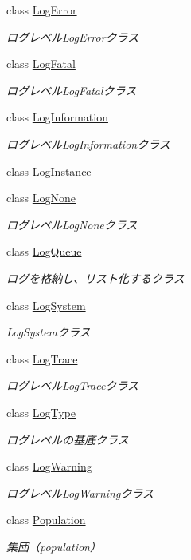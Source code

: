 \begin{DoxyCompactItemize}
class \mbox{\hyperlink{class_g_a_1_1_log_error}{Log\+Error}}
\begin{DoxyCompactList}\small\item\em ログレベル\+Log\+Errorクラス \end{DoxyCompactList}\item 
class \mbox{\hyperlink{class_g_a_1_1_log_fatal}{Log\+Fatal}}
\begin{DoxyCompactList}\small\item\em ログレベル\+Log\+Fatalクラス \end{DoxyCompactList}\item 
class \mbox{\hyperlink{class_g_a_1_1_log_information}{Log\+Information}}
\begin{DoxyCompactList}\small\item\em ログレベル\+Log\+Informationクラス \end{DoxyCompactList}\item 
class \mbox{\hyperlink{class_g_a_1_1_log_instance}{Log\+Instance}}
\item 
class \mbox{\hyperlink{class_g_a_1_1_log_none}{Log\+None}}
\begin{DoxyCompactList}\small\item\em ログレベル\+Log\+Noneクラス \end{DoxyCompactList}\item 
class \mbox{\hyperlink{class_g_a_1_1_log_queue}{Log\+Queue}}
\begin{DoxyCompactList}\small\item\em ログを格納し、リスト化するクラス \end{DoxyCompactList}\item 
class \mbox{\hyperlink{class_g_a_1_1_log_system}{Log\+System}}
\begin{DoxyCompactList}\small\item\em Log\+Systemクラス \end{DoxyCompactList}\item 
class \mbox{\hyperlink{class_g_a_1_1_log_trace}{Log\+Trace}}
\begin{DoxyCompactList}\small\item\em ログレベル\+Log\+Traceクラス \end{DoxyCompactList}\item 
class \mbox{\hyperlink{class_g_a_1_1_log_type}{Log\+Type}}
\begin{DoxyCompactList}\small\item\em ログレベルの基底クラス \end{DoxyCompactList}\item 
class \mbox{\hyperlink{class_g_a_1_1_log_warning}{Log\+Warning}}
\begin{DoxyCompactList}\small\item\em ログレベル\+Log\+Warningクラス \end{DoxyCompactList}\item 
class \mbox{\hyperlink{class_g_a_1_1_population}{Population}}
\begin{DoxyCompactList}\small\item\em 集団（population） \end{DoxyCompactList}\end{DoxyCompactItemize}
